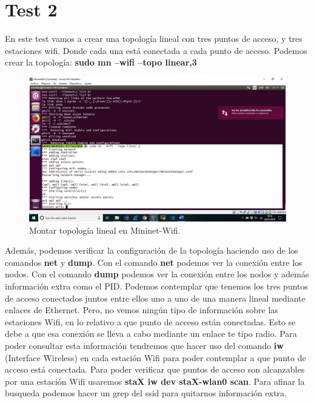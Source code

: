 \section{Test 2}
En este test vamos a crear una topología lineal con tres puntos de acceso, y tres estaciones wifi. Donde cada una está conectada a cada punto de acceso.\newline
\newline
Podemos crear la topología: \textbf{sudo mn --wifi --topo linear,3}
\newpage
\begin{figure}[!htb]
  \centering
    \includegraphics[width=\linewidth]{./img/9.JPG}
    \caption{Montar topología lineal en Mininet-Wifi.}
  \label{fig:yo}
\end{figure}
Además,  podemos  verificar la configuración de la topología haciendo uso de los comandos \textbf{net} y \textbf{dump}. Con el comando \textbf{net} podemos ver la conexión entre los nodos. Con el comando \textbf{dump} podemos ver la conexión entre los nodos y además información extra como el PID.\newline
\newline
Podemos contemplar que tenemos los tres puntos de acceso conectados juntos entre ellos uno a uno de una manera lineal mediante enlaces de Ethernet. Pero, no vemos ningún tipo de información sobre las estaciones Wifi, en lo relativo a que punto de acceso están conectadas. Esto se debe a que esa conexión se lleva a cabo mediante un enlace te tipo radio. Para poder consultar esta información tendremos que hacer uso del comando \textbf{iw} (Interface Wireless) en cada estación Wifi para poder contemplar a que punto de acceso está conectada. \newline
\newline
Para poder verificar que puntos de acceso son alcanzables por una estación Wifi usaremos \textbf{staX iw dev staX-wlan0 scan}. Para afinar la busqueda podemos hacer un grep del ssid para quitarnos información extra.\newline
